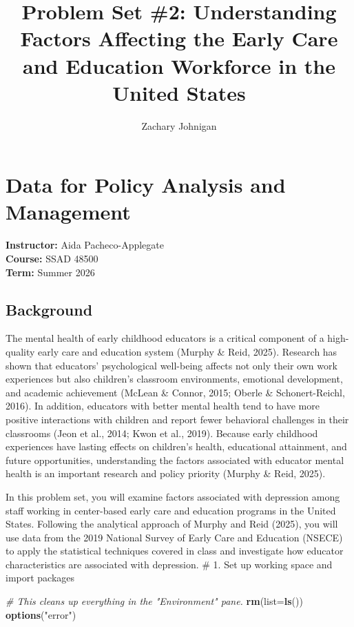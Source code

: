 \documentclass[
]{article}
\title{Problem Set \#2: Understanding Factors Affecting the Early Care
and Education Workforce in the United States}
\author{Zachary Johnigan}
\date{}
\newenvironment{Shaded}{\begin{snugshade}}{\end{snugshade}}
\newcommand{\AttributeTok}[1]{\textcolor[rgb]{0.13,0.29,0.53}{#1}}
\newcommand{\CommentTok}[1]{\textcolor[rgb]{0.56,0.35,0.01}{\textit{#1}}}
\newcommand{\FunctionTok}[1]{\textcolor[rgb]{0.13,0.29,0.53}{\textbf{#1}}}
\newcommand{\NormalTok}[1]{#1}
\newcommand{\StringTok}[1]{\textcolor[rgb]{0.31,0.60,0.02}{#1}}
\begin{document}
\maketitle

\section{Data for Policy Analysis and
Management}\label{data-for-policy-analysis-and-management}

\textbf{Instructor:} Aida Pacheco-Applegate\\
\textbf{Course:} SSAD 48500\\
\textbf{Term:} Summer 2026

\subsection{Background}\label{background}

The mental health of early childhood educators is a critical component
of a high-quality early care and education system (Murphy \& Reid,
2025). Research has shown that educators' psychological well-being
affects not only their own work experiences but also children's
classroom environments, emotional development, and academic achievement
(McLean \& Connor, 2015; Oberle \& Schonert-Reichl, 2016). In addition,
educators with better mental health tend to have more positive
interactions with children and report fewer behavioral challenges in
their classrooms (Jeon et al., 2014; Kwon et al., 2019). Because early
childhood experiences have lasting effects on children's health,
educational attainment, and future opportunities, understanding the
factors associated with educator mental health is an important research
and policy priority (Murphy \& Reid, 2025).

In this problem set, you will examine factors associated with depression
among staff working in center-based early care and education programs in
the United States. Following the analytical approach of Murphy and Reid
(2025), you will use data from the 2019 National Survey of Early Care
and Education (NSECE) to apply the statistical techniques covered in
class and investigate how educator characteristics are associated with
depression. \newpage \# 1. Set up working space and import packages

\begin{Shaded}
\begin{Highlighting}[]
\CommentTok{\# This cleans up everything in the "Environment" pane.}
\FunctionTok{rm}\NormalTok{(}\AttributeTok{list=}\FunctionTok{ls}\NormalTok{())}
\FunctionTok{options}\NormalTok{(}\StringTok{"error"}\NormalTok{)}
\end{Highlighting}
\end{Shaded}
\end{document}
